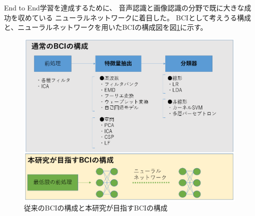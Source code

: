 End to End学習を達成するために、
音声認識と画像認識の分野で既に大きな成功を収めている
ニューラルネットワークに着目した。
BCIとして考えうる構成と、ニューラルネットワークを用いたBCIの構成図を図\ref{fig:BCIpattern}に示す。
\begin{figure}
    \centering
    \includegraphics[width=12cm]{images/BCIpattern.PNG}
    \caption{従来のBCIの構成と本研究が目指すBCIの構成}
    \label{fig:BCIpattern}
\end{figure}








